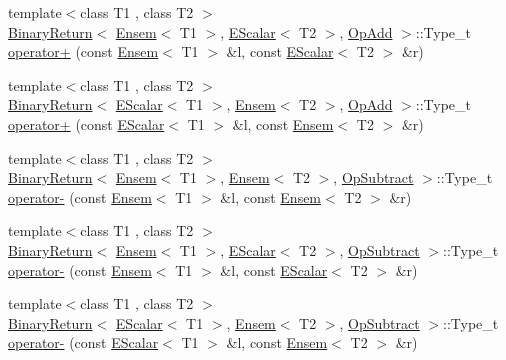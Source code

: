 \begin{DoxyCompactItemize}
\item 
{\footnotesize template$<$class T1 , class T2 $>$ }\\\mbox{\hyperlink{structENSEM_1_1BinaryReturn}{Binary\+Return}}$<$ \mbox{\hyperlink{classENSEM_1_1Ensem}{Ensem}}$<$ T1 $>$, \mbox{\hyperlink{classENSEM_1_1EScalar}{E\+Scalar}}$<$ T2 $>$, \mbox{\hyperlink{structENSEM_1_1OpAdd}{Op\+Add}} $>$\+::Type\+\_\+t \mbox{\hyperlink{group__eensem_ga370913e6f39a2b7be0ce0b78f156978a}{operator+}} (const \mbox{\hyperlink{classENSEM_1_1Ensem}{Ensem}}$<$ T1 $>$ \&l, const \mbox{\hyperlink{classENSEM_1_1EScalar}{E\+Scalar}}$<$ T2 $>$ \&r)
\item 
{\footnotesize template$<$class T1 , class T2 $>$ }\\\mbox{\hyperlink{structENSEM_1_1BinaryReturn}{Binary\+Return}}$<$ \mbox{\hyperlink{classENSEM_1_1EScalar}{E\+Scalar}}$<$ T1 $>$, \mbox{\hyperlink{classENSEM_1_1Ensem}{Ensem}}$<$ T2 $>$, \mbox{\hyperlink{structENSEM_1_1OpAdd}{Op\+Add}} $>$\+::Type\+\_\+t \mbox{\hyperlink{group__eensem_ga28163898a2dffc17215669f8a85d65b4}{operator+}} (const \mbox{\hyperlink{classENSEM_1_1EScalar}{E\+Scalar}}$<$ T1 $>$ \&l, const \mbox{\hyperlink{classENSEM_1_1Ensem}{Ensem}}$<$ T2 $>$ \&r)
\item 
{\footnotesize template$<$class T1 , class T2 $>$ }\\\mbox{\hyperlink{structENSEM_1_1BinaryReturn}{Binary\+Return}}$<$ \mbox{\hyperlink{classENSEM_1_1Ensem}{Ensem}}$<$ T1 $>$, \mbox{\hyperlink{classENSEM_1_1Ensem}{Ensem}}$<$ T2 $>$, \mbox{\hyperlink{structENSEM_1_1OpSubtract}{Op\+Subtract}} $>$\+::Type\+\_\+t \mbox{\hyperlink{group__eensem_gaa7400c6ebea61c6e2869c81ab28d68b0}{operator-\/}} (const \mbox{\hyperlink{classENSEM_1_1Ensem}{Ensem}}$<$ T1 $>$ \&l, const \mbox{\hyperlink{classENSEM_1_1Ensem}{Ensem}}$<$ T2 $>$ \&r)
\item 
{\footnotesize template$<$class T1 , class T2 $>$ }\\\mbox{\hyperlink{structENSEM_1_1BinaryReturn}{Binary\+Return}}$<$ \mbox{\hyperlink{classENSEM_1_1Ensem}{Ensem}}$<$ T1 $>$, \mbox{\hyperlink{classENSEM_1_1EScalar}{E\+Scalar}}$<$ T2 $>$, \mbox{\hyperlink{structENSEM_1_1OpSubtract}{Op\+Subtract}} $>$\+::Type\+\_\+t \mbox{\hyperlink{group__eensem_ga2ca6914217df099912f3f38239141a55}{operator-\/}} (const \mbox{\hyperlink{classENSEM_1_1Ensem}{Ensem}}$<$ T1 $>$ \&l, const \mbox{\hyperlink{classENSEM_1_1EScalar}{E\+Scalar}}$<$ T2 $>$ \&r)
\item 
{\footnotesize template$<$class T1 , class T2 $>$ }\\\mbox{\hyperlink{structENSEM_1_1BinaryReturn}{Binary\+Return}}$<$ \mbox{\hyperlink{classENSEM_1_1EScalar}{E\+Scalar}}$<$ T1 $>$, \mbox{\hyperlink{classENSEM_1_1Ensem}{Ensem}}$<$ T2 $>$, \mbox{\hyperlink{structENSEM_1_1OpSubtract}{Op\+Subtract}} $>$\+::Type\+\_\+t \mbox{\hyperlink{group__eensem_ga800941462d54db3919bdb1fe8cd1c1b6}{operator-\/}} (const \mbox{\hyperlink{classENSEM_1_1EScalar}{E\+Scalar}}$<$ T1 $>$ \&l, const \mbox{\hyperlink{classENSEM_1_1Ensem}{Ensem}}$<$ T2 $>$ \&r)

\end{DoxyCompactItemize}
